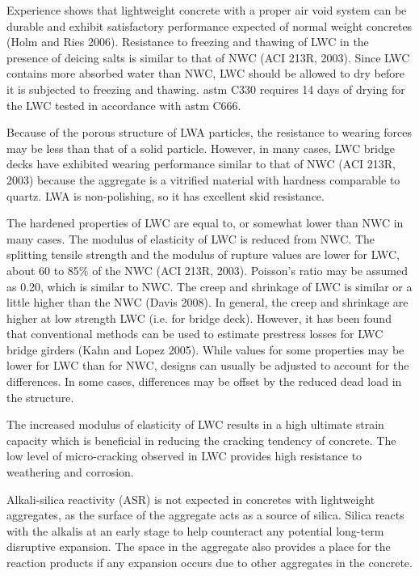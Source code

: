Experience shows that lightweight concrete with a proper air void system can be durable and exhibit satisfactory performance expected of normal weight concretes (Holm and Ries 2006). Resistance to freezing and thawing of LWC in the presence of deicing salts is similar to that of NWC (ACI 213R, 2003). Since LWC contains more absorbed water than NWC, LWC should be allowed to dry before it is subjected to freezing and thawing. \acrshort*{astm} C330 requires 14 days of drying for the LWC tested in accordance with \acrshort*{astm} C666.

Because of the porous structure of LWA particles, the resistance to wearing forces may be less than that of a solid particle. However, in many cases, LWC bridge decks have exhibited wearing performance similar to that of NWC (ACI 213R, 2003) because the aggregate is a vitrified material with hardness comparable to quartz. LWA is non-polishing, so it has excellent skid resistance.

The hardened properties of LWC are equal to, or somewhat lower than NWC in many cases. The modulus of elasticity of LWC is reduced from NWC. The splitting tensile strength and the modulus of rupture values are lower for LWC, about 60 to 85\% of the NWC (ACI 213R, 2003). Poisson’s ratio may be assumed as 0.20, which is similar to NWC. The creep and shrinkage of LWC is similar or a little higher than the NWC (Davis 2008). In general, the creep and shrinkage are higher at low strength LWC (i.e. for bridge deck). However, it has been found that conventional methods can be used to estimate prestress losses for LWC bridge girders (Kahn and Lopez 2005).  While values for some properties may be lower for LWC than for NWC, designs can usually be adjusted to account for the differences. In some cases, differences may be offset by the reduced dead load in the structure.

The increased modulus of elasticity of LWC results in a high ultimate strain capacity which is beneficial in reducing the cracking tendency of concrete. The low level of micro-cracking observed in LWC provides high resistance to weathering and corrosion.

Alkali-silica reactivity (ASR) is not expected in concretes with lightweight aggregates, as the surface of the aggregate acts as a source of silica. Silica reacts with the alkalis at an early stage to help counteract any potential long-term disruptive expansion. The space in the aggregate also provides a place for the reaction products if any expansion occurs due to other aggregates in the concrete.

